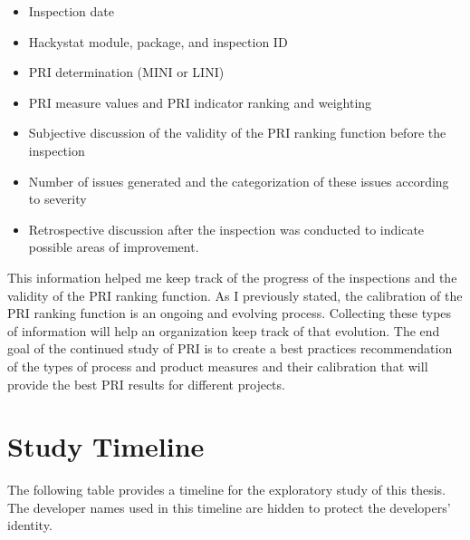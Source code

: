 \begin{itemize}
\item Inspection date
\item Hackystat module, package, and inspection ID
\item PRI determination (MINI or LINI)
\item PRI measure values and PRI indicator ranking and weighting
\item Subjective discussion of the validity of the PRI ranking function
  before the inspection
\item Number of issues generated and the categorization of these issues
  according to severity
\item Retrospective discussion after the inspection was conducted to
  indicate possible areas of improvement. 
\end{itemize}


This information helped me keep track of the progress of the inspections
and the validity of the PRI ranking function. As I previously stated, the
calibration of the PRI ranking function is an ongoing and evolving process.
Collecting these types of information will help an organization keep track
of that evolution. The end goal of the continued study of PRI is to create
a best practices recommendation of the types of process and product
measures and their calibration that will provide the best PRI results for
different projects.

\section{Study Timeline}
The following table provides a timeline for the exploratory study of this
thesis. The developer names used in this timeline are hidden to protect
the developers' identity.


